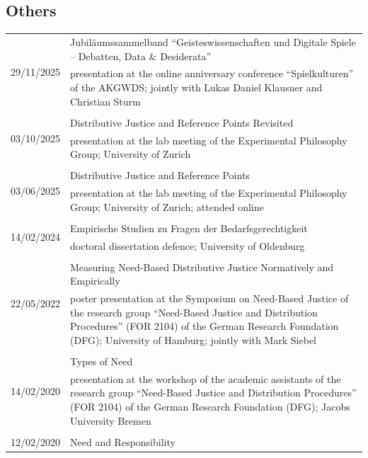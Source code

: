 \documentclass[a4paper,10pt]{article}
\begin{document}
\subsection*{Others}
\begin{longtable}{p{2.5cm}p{11cm}}
\multirow{2}{2.5cm}{\footnotesize{29/11/2025}} & Jubiläumssammelband \enquote{Geisteswissenschaften und Digitale Spiele -- Debatten, Data \& Desiderata}\\
& \footnotesize{presentation at the online anniversary conference \enquote{Spielkulturen} of the AKGWDS; jointly with Lukas Daniel Klausner and Christian Sturm}\\
\\
\multirow{2}{2.5cm}{\footnotesize{03/10/2025}} & Distributive Justice and Reference Points Revisited\\
& \footnotesize{presentation at the lab meeting of the Experimental Philosophy Group; University of Zurich}\\
\\
\multirow{2}{2.5cm}{\footnotesize{03/06/2025}} & Distributive Justice and Reference Points\\
& \footnotesize{presentation at the lab meeting of the Experimental Philosophy Group; University of Zurich; attended online}\\
\\
\multirow{2}{2.5cm}{\footnotesize{14/02/2024}} & Empirische Studien zu Fragen der Bedarfsgerechtigkeit\\
& \footnotesize{doctoral dissertation defence; University of Oldenburg}\\
\\
\multirow{2}{2.5cm}{\footnotesize{22/05/2022}} & Measuring Need-Based Distributive Justice Normatively and Empirically\\
& \footnotesize{poster presentation at the Symposium on Need-Based Justice of the research group \enquote{Need-Based Justice and Distribution Procedures} (FOR 2104) of the German Research Foundation (DFG); University of Hamburg; jointly with Mark Siebel}\\
\\
\multirow{2}{2.5cm}{\footnotesize{14/02/2020}} & Types of Need\\
& \footnotesize{presentation at the workshop of the academic assistants of the research group \enquote{Need-Based Justice and Distribution Procedures} (FOR 2104) of the German Research Foundation (DFG); Jacobs University Bremen}\\
\\
\multirow{2}{2.5cm}{\footnotesize{12/02/2020}} & Need and Responsibility\\

\end{longtable}
\end{document}
